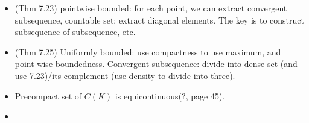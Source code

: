 \documentclass{article}
\theoremstyle{remark}
\begin{document}
\begin{itemize}
\item (Thm 7.23) pointwise bounded: for each point, we can extract convergent subsequence, countable set: extract diagonal elements. The key is to construct subsequence of subsequence, etc.
\item (Thm 7.25) Uniformly bounded: use compactness to use maximum, and point-wise boundedness. Convergent subsequence: divide into dense set (and use 7.23)/its complement (use density to divide into three).
\item Precompact set of $C(K)$ is equicontinuous(?, page 45).
\item 
\end{itemize}
\end{document}
